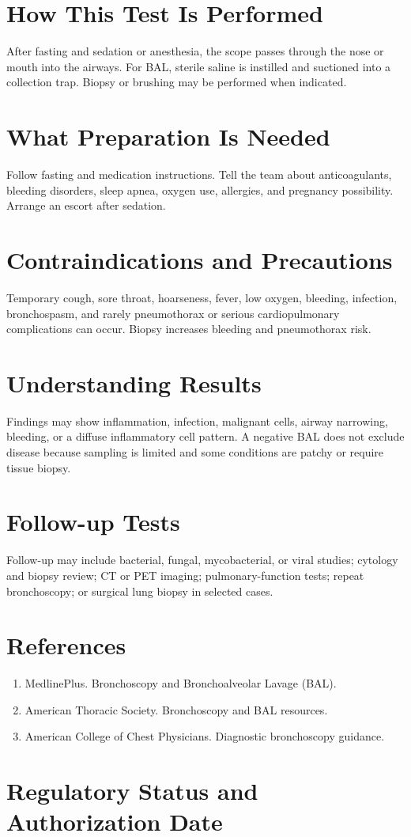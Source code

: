 \section*{How This Test Is Performed}
After fasting and sedation or anesthesia, the scope passes through the nose or mouth into the airways. For BAL, sterile saline is instilled and suctioned into a collection trap. Biopsy or brushing may be performed when indicated.

\section*{What Preparation Is Needed}
Follow fasting and medication instructions. Tell the team about anticoagulants, bleeding disorders, sleep apnea, oxygen use, allergies, and pregnancy possibility. Arrange an escort after sedation.

\section*{Contraindications and Precautions}
Temporary cough, sore throat, hoarseness, fever, low oxygen, bleeding, infection, bronchospasm, and rarely pneumothorax or serious cardiopulmonary complications can occur. Biopsy increases bleeding and pneumothorax risk.

\section*{Understanding Results}
Findings may show inflammation, infection, malignant cells, airway narrowing, bleeding, or a diffuse inflammatory cell pattern. A negative BAL does not exclude disease because sampling is limited and some conditions are patchy or require tissue biopsy.

\section*{Follow-up Tests}
Follow-up may include bacterial, fungal, mycobacterial, or viral studies; cytology and biopsy review; CT or PET imaging; pulmonary-function tests; repeat bronchoscopy; or surgical lung biopsy in selected cases.

\section*{References}
\begin{enumerate}
  \item MedlinePlus. Bronchoscopy and Bronchoalveolar Lavage (BAL).
  \item American Thoracic Society. Bronchoscopy and BAL resources.
  \item American College of Chest Physicians. Diagnostic bronchoscopy guidance.
\end{enumerate}

\clearpage


\section*{Regulatory Status and Authorization Date}

\clearpage
